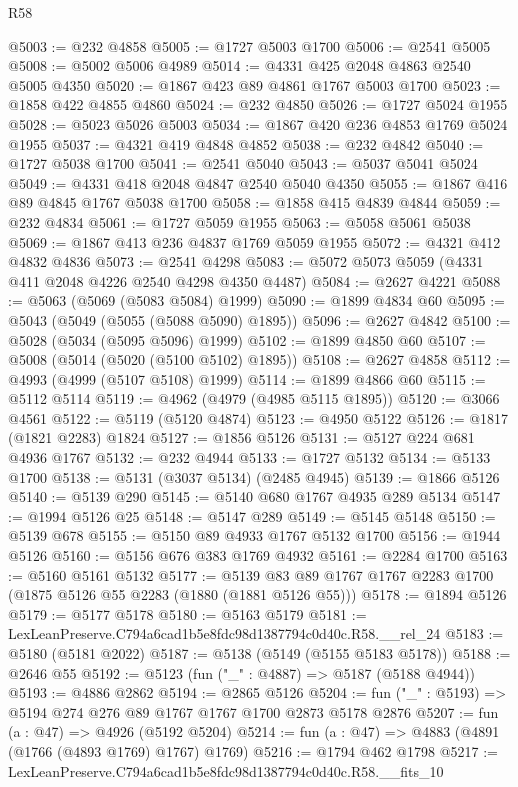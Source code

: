 \begin{lexlean}{R58}
\begin{coremodule}
@5003 := @232 @4858
@5005 := @1727 @5003 @1700
@5006 := @2541 @5005
@5008 := @5002 @5006 @4989
@5014 := @4331 @425 @2048 @4863 @2540 @5005 @4350
@5020 := @1867 @423 @89 @4861 @1767 @5003 @1700
@5023 := @1858 @422 @4855 @4860
@5024 := @232 @4850
@5026 := @1727 @5024 @1955
@5028 := @5023 @5026 @5003
@5034 := @1867 @420 @236 @4853 @1769 @5024 @1955
@5037 := @4321 @419 @4848 @4852
@5038 := @232 @4842
@5040 := @1727 @5038 @1700
@5041 := @2541 @5040
@5043 := @5037 @5041 @5024
@5049 := @4331 @418 @2048 @4847 @2540 @5040 @4350
@5055 := @1867 @416 @89 @4845 @1767 @5038 @1700
@5058 := @1858 @415 @4839 @4844
@5059 := @232 @4834
@5061 := @1727 @5059 @1955
@5063 := @5058 @5061 @5038
@5069 := @1867 @413 @236 @4837 @1769 @5059 @1955
@5072 := @4321 @412 @4832 @4836
@5073 := @2541 @4298
@5083 := @5072 @5073 @5059 (@4331 @411 @2048 @4226 @2540 @4298 @4350 @4487)
@5084 := @2627 @4221
@5088 := @5063 (@5069 (@5083 @5084) @1999)
@5090 := @1899 @4834 @60
@5095 := @5043 (@5049 (@5055 (@5088 @5090) @1895))
@5096 := @2627 @4842
@5100 := @5028 (@5034 (@5095 @5096) @1999)
@5102 := @1899 @4850 @60
@5107 := @5008 (@5014 (@5020 (@5100 @5102) @1895))
@5108 := @2627 @4858
@5112 := @4993 (@4999 (@5107 @5108) @1999)
@5114 := @1899 @4866 @60
@5115 := @5112 @5114
@5119 := @4962 (@4979 (@4985 @5115 @1895))
@5120 := @3066 @4561
@5122 := @5119 (@5120 @4874)
@5123 := @4950 @5122
@5126 := @1817 (@1821 @2283) @1824
@5127 := @1856 @5126
@5131 := @5127 @224 @681 @4936 @1767
@5132 := @232 @4944
@5133 := @1727 @5132
@5134 := @5133 @1700
@5138 := @5131 (@3037 @5134) (@2485 @4945)
@5139 := @1866 @5126
@5140 := @5139 @290
@5145 := @5140 @680 @1767 @4935 @289 @5134
@5147 := @1994 @5126 @25
@5148 := @5147 @289
@5149 := @5145 @5148
@5150 := @5139 @678
@5155 := @5150 @89 @4933 @1767 @5132 @1700
@5156 := @1944 @5126
@5160 := @5156 @676 @383 @1769 @4932
@5161 := @2284 @1700
@5163 := @5160 @5161 @5132
@5177 := @5139 @83 @89 @1767 @1767 @2283 @1700 (@1875 @5126 @55 @2283 (@1880 (@1881 @5126 @55)))
@5178 := @1894 @5126
@5179 := @5177 @5178
@5180 := @5163 @5179
@5181 := LexLeanPreserve.C794a6cad1b5e8fdc98d1387794c0d40c.R58.__rel_24
@5183 := @5180 (@5181 @2022)
@5187 := @5138 (@5149 (@5155 @5183 @5178))
@5188 := @2646 @55
@5192 := @5123 (fun ("_" : @4887) => @5187 (@5188 @4944))
@5193 := @4886 @2862
@5194 := @2865 @5126
@5204 := fun ("_" : @5193) => @5194 @274 @276 @89 @1767 @1767 @1700 @2873 @5178 @2876
@5207 := fun (a : @47) => @4926 (@5192 @5204)
@5214 := fun (a : @47) => @4883 (@4891 (@1766 (@4893 @1769) @1767) @1769)
@5216 := @1794 @462 @1798
@5217 := LexLeanPreserve.C794a6cad1b5e8fdc98d1387794c0d40c.R58.__fits_10

\end{coremodule}
\end{lexlean}
